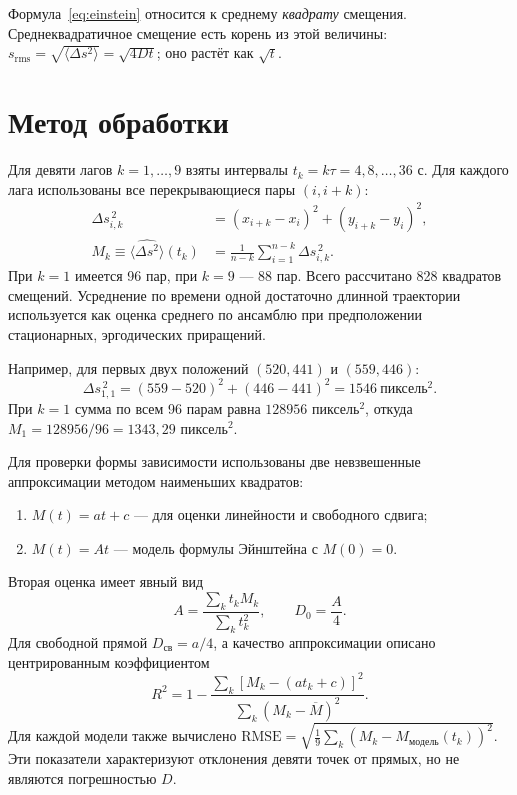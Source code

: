 \documentclass[12pt,a4paper]{article}
\begin{document}
Формула~\eqref{eq:einstein} относится к среднему \emph{квадрату} смещения.
Среднеквадратичное смещение есть корень из этой величины:
$s_{\mathrm{rms}}=\sqrt{\langle\Delta s^2\rangle}=\sqrt{4Dt}$;
оно растёт как $\sqrt t$.

\section{Метод обработки}
Для девяти лагов $k=1,\ldots,9$ взяты интервалы
$t_k=k\tau=4,8,\ldots,36$ с. Для каждого лага использованы все
перекрывающиеся пары $(i,i+k)$:
\begin{align}
 \Delta s_{i,k}^{\,2}&=(x_{i+k}-x_i)^2+(y_{i+k}-y_i)^2,\\
 M_k\equiv\widehat{\langle\Delta s^2\rangle}(t_k)
 &=\frac{1}{n-k}\sum_{i=1}^{n-k}\Delta s_{i,k}^{\,2}.
 \label{eq:estimate}
\end{align}
При $k=1$ имеется 96 пар, при $k=9$ --- 88 пар. Всего рассчитано
828 квадратов смещений. Усреднение по времени одной достаточно длинной
траектории используется как оценка среднего по ансамблю при предположении
стационарных, эргодических приращений.

Например, для первых двух положений $(520,441)$ и $(559,446)$:
\[
 \Delta s_{1,1}^{\,2}=(559-520)^2+(446-441)^2=1546\ \text{пиксель}^2.
\]
При $k=1$ сумма по всем 96 парам равна $128956$ пиксель$^2$, откуда
$M_1=128956/96=1343{,}29$ пиксель$^2$.

Для проверки формы зависимости использованы две невзвешенные
аппроксимации методом наименьших квадратов:
\begin{enumerate}
 \item $M(t)=at+c$ --- для оценки линейности и свободного сдвига;
 \item $M(t)=At$ --- модель формулы Эйнштейна с $M(0)=0$.
\end{enumerate}
Вторая оценка имеет явный вид
\begin{equation}
 A=\frac{\sum_k t_k M_k}{\sum_k t_k^2},\qquad D_0=\frac A4.
\end{equation}
Для свободной прямой $D_{\mathrm{св}}=a/4$, а качество аппроксимации
описано центрированным коэффициентом
\begin{equation}
 R^2=1-\frac{\sum_k[M_k-(at_k+c)]^2}
 {\sum_k(M_k-\overline M)^2}.
\end{equation}
Для каждой модели также вычислено
$\mathrm{RMSE}=\sqrt{\frac19\sum_k(M_k-M_{\mathrm{модель}}(t_k))^2}$.
Эти показатели характеризуют отклонения девяти точек от прямых,
но не являются погрешностью $D$.
\end{document}
